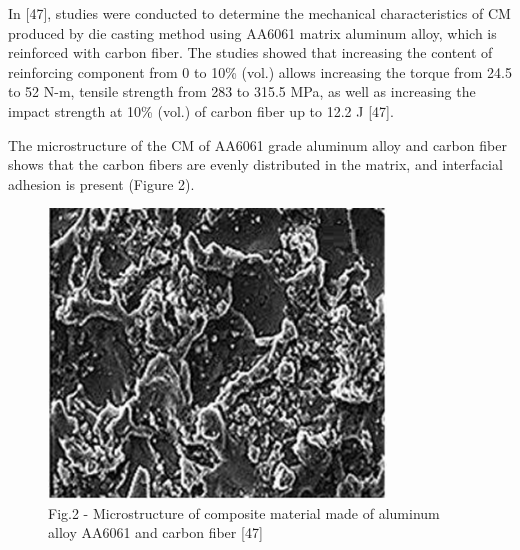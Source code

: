 \begin{multicols}{2}
In {[}47{]}, studies were conducted to determine the mechanical
characteristics of CM produced by die casting method using AA6061 matrix
aluminum alloy, which is reinforced with carbon fiber. The studies
showed that increasing the content of reinforcing component from 0 to
10\% (vol.) allows increasing the torque from 24.5 to 52 N-m, tensile
strength from 283 to 315.5 MPa, as well as increasing the impact
strength at 10\% (vol.) of carbon fiber up to 12.2 J {[}47{]}.

The microstructure of the CM of AA6061 grade aluminum alloy and carbon
fiber shows that the carbon fibers are evenly distributed in the matrix,
and interfacial adhesion is present (Figure 2).
\end{multicols}

\begin{figure}[H]
	\centering
	\includegraphics[width=0.8\textwidth]{media/chem/image8}
	\caption*{Fig.2 - Microstructure of composite material made of aluminum alloy AA6061 and carbon fiber {[}47{]}}
\end{figure}

